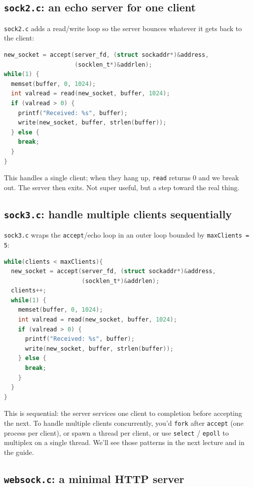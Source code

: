 \documentclass[11pt]{article}
\begin{document}
\subsection*{\texttt{sock2.c}: an echo server for one client}

\texttt{sock2.c} adds a read/write loop so the server bounces
whatever it gets back to the client:

\begin{lstlisting}[language=C]
new_socket = accept(server_fd, (struct sockaddr*)&address,
                    (socklen_t*)&addrlen);
while(1) {
  memset(buffer, 0, 1024);
  int valread = read(new_socket, buffer, 1024);
  if (valread > 0) {
    printf("Received: %s", buffer);
    write(new_socket, buffer, strlen(buffer));
  } else {
    break;
  }
}
\end{lstlisting}

This handles a single client; when they hang up, \texttt{read}
returns 0 and we break out. The server then exits. Not super useful,
but a step toward the real thing.

\subsection*{\texttt{sock3.c}: handle multiple clients sequentially}

\texttt{sock3.c} wraps the \texttt{accept}/echo loop in an outer
loop bounded by \texttt{maxClients = 5}:

\begin{lstlisting}[language=C]
while(clients < maxClients){
  new_socket = accept(server_fd, (struct sockaddr*)&address,
                      (socklen_t*)&addrlen);
  clients++;
  while(1) {
    memset(buffer, 0, 1024);
    int valread = read(new_socket, buffer, 1024);
    if (valread > 0) {
      printf("Received: %s", buffer);
      write(new_socket, buffer, strlen(buffer));
    } else {
      break;
    }
  }
}
\end{lstlisting}

This is sequential: the server services one client to completion
before accepting the next. To handle multiple clients
concurrently, you'd \texttt{fork} after \texttt{accept} (one process
per client), or spawn a thread per client, or use \texttt{select}
/ \texttt{epoll} to multiplex on a single thread. We'll see those
patterns in the next lecture and in the guide.

\subsection*{\texttt{websock.c}: a minimal HTTP server}
\end{document}
